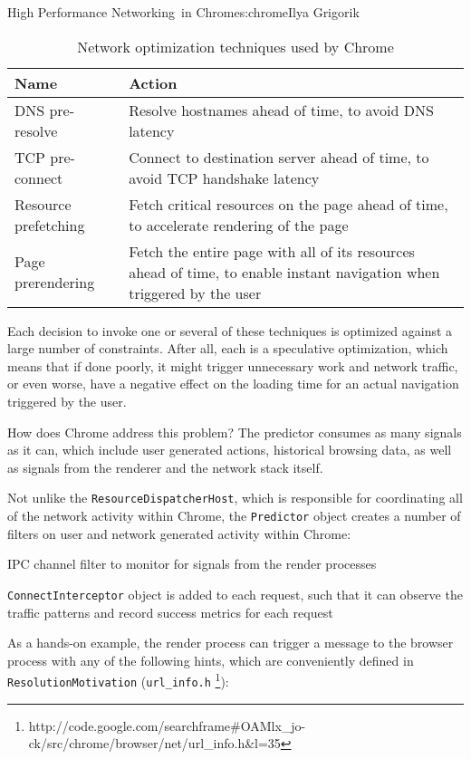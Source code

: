 \begin{aosachapter}{High Performance Networking~in Chrome}{s:chrome}{Ilya Grigorik}
\begin{table}[h!]
\centering
{\footnotesize
{}
\begin{tabular}{p{3.0cm} p{5.0cm}}
\hline
\textbf{Name}
& \textbf{Action}
\\
\hline
DNS pre-resolve
& Resolve hostnames ahead of time, to avoid DNS latency
\\
TCP pre-connect
& Connect to destination server ahead of time, to avoid TCP handshake latency
\\
Resource prefetching
& Fetch critical resources on the page ahead of time, to accelerate rendering of the page
\\
Page prerendering
& Fetch the entire page with all of its resources ahead of time, to enable instant navigation when triggered by the user
\\
\hline
\end{tabular}
}
\caption{Network optimization techniques used by Chrome}
\label{posa.chrome.opt}
\end{table}

Each decision to invoke one or several of these techniques is optimized
against a large number of constraints. After all, each is a speculative
optimization, which means that if done poorly, it might trigger
unnecessary work and network traffic, or even worse, have a negative
effect on the loading time for an actual navigation triggered by the
user.

How does Chrome address this problem? The predictor consumes as many
signals as it can, which include user generated actions, historical
browsing data, as well as signals from the renderer and the network
stack itself.

Not unlike the \texttt{ResourceDispatcherHost}, which is responsible for
coordinating all of the network activity within Chrome, the
\texttt{Predictor} object creates a number of filters on user and
network generated activity within Chrome:

\begin{aosaitemize}

\item
  IPC channel filter to monitor for signals from the render processes
\item
  \texttt{ConnectInterceptor} object is added to each request, such that
  it can observe the traffic patterns and record success metrics for
  each request
\end{aosaitemize}

As a hands-on example, the render process can trigger a message to the
browser process with any of the following hints, which are conveniently
defined in \texttt{ResolutionMotivation} (\texttt{url\_info.h}
\footnote{http://code.google.com/searchframe\#OAMlx\_jo-ck/src/chrome/browser/net/url\_info.h\&l=35}):


\end{aosachapter}
